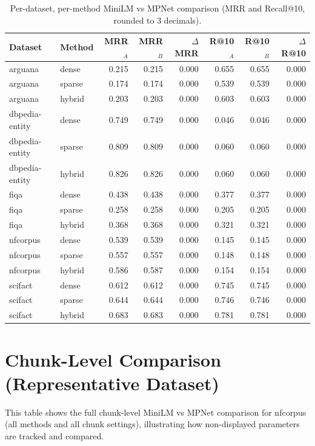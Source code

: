 \documentclass[twoside, 11pt]{article}
\begin{document}
\begin{table}[H]
\centering
\caption{Per-dataset, per-method MiniLM vs MPNet comparison (MRR and Recall@10, rounded to 3 decimals).}
\label{tab:appendix_dataset_level}
\scriptsize
\begin{tabular}{llrrrrrr}
\toprule
Dataset & Method & MRR$_A$ & MRR$_B$ & $\Delta$MRR & R@10$_A$ & R@10$_B$ & $\Delta$R@10 \\
\midrule
arguana & dense  & 0.215 & 0.215 &  0.000 & 0.655 & 0.655 &  0.000 \\
arguana & sparse & 0.174 & 0.174 &  0.000 & 0.539 & 0.539 &  0.000 \\
arguana & hybrid & 0.203 & 0.203 &  0.000 & 0.603 & 0.603 &  0.000 \\
dbpedia-entity & dense  & 0.749 & 0.749 &  0.000 & 0.046 & 0.046 &  0.000 \\
dbpedia-entity & sparse & 0.809 & 0.809 &  0.000 & 0.060 & 0.060 &  0.000 \\
dbpedia-entity & hybrid & 0.826 & 0.826 &  0.000 & 0.060 & 0.060 &  0.000 \\
fiqa & dense  & 0.438 & 0.438 &  0.000 & 0.377 & 0.377 &  0.000 \\
fiqa & sparse & 0.258 & 0.258 &  0.000 & 0.205 & 0.205 &  0.000 \\
fiqa & hybrid & 0.368 & 0.368 &  0.000 & 0.321 & 0.321 &  0.000 \\
nfcorpus & dense  & 0.539 & 0.539 &  0.000 & 0.145 & 0.145 &  0.000 \\
nfcorpus & sparse & 0.557 & 0.557 &  0.000 & 0.148 & 0.148 &  0.000 \\
nfcorpus & hybrid & 0.586 & 0.587 &  0.000 & 0.154 & 0.154 &  0.000 \\
scifact & dense  & 0.612 & 0.612 &  0.000 & 0.745 & 0.745 &  0.000 \\
scifact & sparse & 0.644 & 0.644 &  0.000 & 0.746 & 0.746 &  0.000 \\
scifact & hybrid & 0.683 & 0.683 &  0.000 & 0.781 & 0.781 &  0.000 \\
\bottomrule
\end{tabular}
\end{table}

\section{Chunk-Level Comparison (Representative Dataset)}
\label{app:chunk_level}
This table shows the full chunk-level MiniLM vs MPNet comparison for nfcorpus (all methods and all chunk settings), illustrating how non-displayed parameters are tracked and compared.
\end{document}
